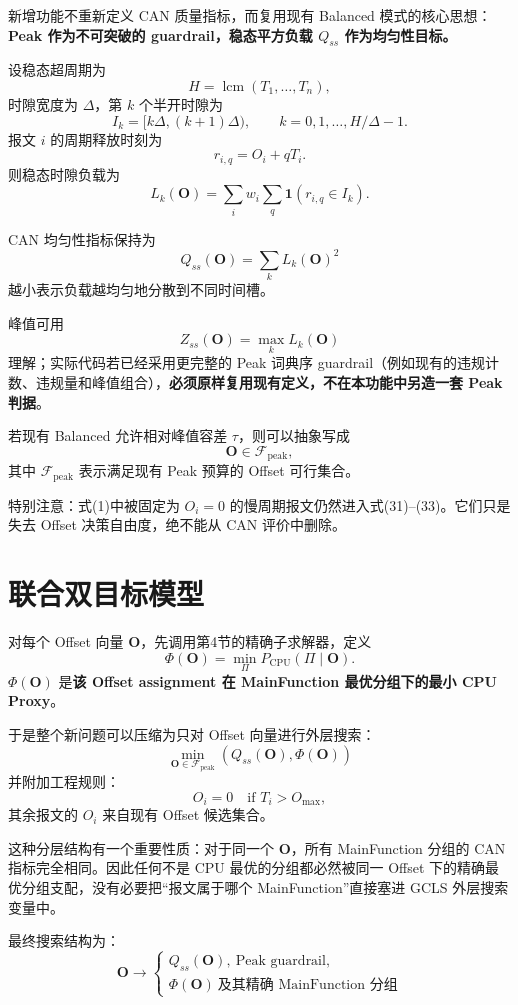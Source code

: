 \documentclass[11pt,a4paper,fontset=none]{ctexart}
\newcommand{\Fpeak}{\mathcal{F}_{\mathrm{peak}}}
\begin{document}
新增功能不重新定义 CAN 质量指标，而复用现有 Balanced 模式的核心思想：\textbf{Peak 作为不可突破的 guardrail，稳态平方负载 $Q_{ss}$ 作为均匀性目标。}

设稳态超周期为
\[
H=\operatorname{lcm}(T_1,\ldots,T_n),
\]
时隙宽度为 $\Delta$，第 $k$ 个半开时隙为
\[
I_k=[k\Delta,(k+1)\Delta),
\qquad k=0,1,\ldots,H/\Delta-1.
\]
报文 $i$ 的周期释放时刻为
\[
r_{i,q}=O_i+qT_i.
\tag{30}
\]
则稳态时隙负载为
\[
L_k(\mathbf O)
=
\sum_i w_i\sum_q
\mathbf 1\!\left(r_{i,q}\in I_k\right).
\tag{31}
\]

CAN 均匀性指标保持为
\[
\boxed{
Q_{ss}(\mathbf O)=\sum_k L_k(\mathbf O)^2
}
\tag{32}
\]
越小表示负载越均匀地分散到不同时间槽。

峰值可用
\[
Z_{ss}(\mathbf O)=\max_kL_k(\mathbf O)
\tag{33}
\]
理解；实际代码若已经采用更完整的 Peak 词典序 guardrail（例如现有的违规计数、违规量和峰值组合），\textbf{必须原样复用现有定义，不在本功能中另造一套 Peak 判据}。

若现有 Balanced 允许相对峰值容差 $\tau$，则可以抽象写成
\[
\mathbf O\in\Fpeak,
\tag{34}
\]
其中 $\Fpeak$ 表示满足现有 Peak 预算的 Offset 可行集合。

特别注意：式(1)中被固定为 $O_i=0$ 的慢周期报文仍然进入式(31)--(33)。它们只是失去 Offset 决策自由度，绝不能从 CAN 评价中删除。

\section{联合双目标模型}

对每个 Offset 向量 $\mathbf O$，先调用第4节的精确子求解器，定义
\[
\Phi(\mathbf O)
=
\min_{\Pi}P_{\mathrm{CPU}}(\Pi\mid\mathbf O).
\tag{35}
\]
$\Phi(\mathbf O)$ 是\textbf{该 Offset assignment 在 MainFunction 最优分组下的最小 CPU Proxy}。

于是整个新问题可以压缩为只对 Offset 向量进行外层搜索：
\[
\boxed{
\min_{\mathbf O\in\Fpeak}
\left(
Q_{ss}(\mathbf O),
\Phi(\mathbf O)
\right)
}
\tag{36}
\]
并附加工程规则：
\[
O_i=0\quad\text{if }T_i>O_{\max},
\tag{37}
\]
其余报文的 $O_i$ 来自现有 Offset 候选集合。

这种分层结构有一个重要性质：对于同一个 $\mathbf O$，所有 MainFunction 分组的 CAN 指标完全相同。因此任何不是 CPU 最优的分组都必然被同一 Offset 下的精确最优分组支配，没有必要把“报文属于哪个 MainFunction”直接塞进 GCLS 外层搜索变量中。

最终搜索结构为：
\[
\mathbf O
\longrightarrow
\begin{cases}
Q_{ss}(\mathbf O),\ \text{Peak guardrail},\\
\Phi(\mathbf O)\ \text{及其精确 MainFunction 分组}
\end{cases}
\tag{38}
\]
\end{document}
